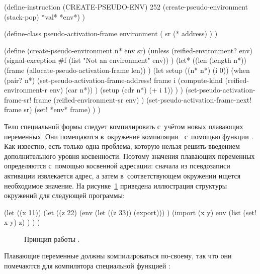 \begin{code:lisp}
(define-instruction (CREATE-PSEUDO-ENV) 252
  (create-pseudo-environment (stack-pop) *val* *env*) )

(define-class pseudo-activation-frame environment
  ( sr (* address) ) )

(define (create-pseudo-environment n* env sr)
  (unless (reified-environment? env)
    (signal-exception #f (list "Not an environment" env)) )
  (let* ((len (length n*))
         (frame (allocate-pseudo-activation-frame len)) )
    (let setup ((n* n*) (i 0))
      (when (pair? n*)
        (set-pseudo-activation-frame-address!
         frame i (compute-kind (reified-environment-r env) (car n*)) )
        (setup (cdr n*) (+ i 1)) ) )
    (set-pseudo-activation-frame-sr! frame
     (reified-environment-sr env) )
    (set-pseudo-activation-frame-next! frame sr)
    (set! *env* frame) ) )
\end{code:lisp}

Тело специальной формы  следует компилировать с~учётом новых
плавающих переменных. Они помещаются в~окружение компиляции~ с~помощью
функции . Как известно, есть только одна проблема, которую
нельзя решить введением дополнительного уровня косвенности. Поэтому значения
плавающих переменных определяются с~помощью косвенной адресации: сначала из
псевдозаписи активации извлекается адрес, а затем в~соответствующем
окружении ищется необходимое значение. На
рисунке~\ref{reflection/reify-env/import/pic:env-struct} приведена иллюстрация
структуры окружений для следующей программы:

\begin{code:lisp}
(let ((x 11))
  (let ((z 22)
        (env (let ((z 33)) (export))) )
    (import (x y) env
      (list (set! x y) z) ) ) )
\end{code:lisp}

\begin{figure}\begin{center}

\end{center}%
\caption{Принцип работы \protect{}.}%
\label{reflection/reify-env/import/pic:env-struct}%
\end{figure}

Плавающие переменные должны компилироваться по-своему, так что они помечаются
для компилятора специальной функцией :

